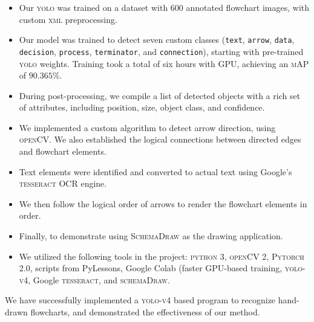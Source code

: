 \documentclass[10pt]{article}
\begin{document}
\begin{itemize}
\item Our \textsc{yolo} was trained on a dataset with 600 annotated flowchart
images, with custom \textsc{xml} preprocessing.
\item Our model was trained to detect seven custom classes (\texttt{text}, \texttt{arrow}, \texttt{data}, \texttt{decision}, \texttt{process}, \texttt{terminator}, and \texttt{connection}), starting with
pre-trained \textsc{yolo} weights. Training took a total of six hours with
\textsc{GPU}, achieving an \textsc{mAP} of $90.365\%$.
\item During post-processing, we compile a list of detected objects with a
rich set of attributes, including position, size, object class, and confidence.
\item We implemented a custom algorithm to detect arrow direction, using
\textsc{openCV}. We also established the logical connections between directed
edges and flowchart elements.
\item Text elements were identified and converted to actual text using
Google's \textsc{tesseract OCR} engine.
\item We then follow the logical order of arrows to render the flowchart
elements in order.
\item Finally, to demonstrate  using \textsc{SchemaDraw} as the drawing application.
\item We utilized the following tools in the project: \textsc{python 3},
\textsc{openCV 2}, \textsc{Pytorch 2.0}, scripts from PyLessons,
Google Colab (faster \textsc{GPU}-based training,
\textsc{yolo-v4}, Google \textsc{tesseract}, and
\textsc{schemaDraw}.
\end{itemize}


We have successfully implemented a \textsc{yolo-v4} based program to
recognize hand-drawn flowcharts, and demonstrated the effectiveness of our
method.

\end{document}
